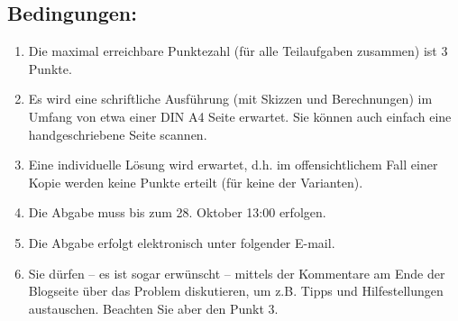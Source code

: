 \subsection{Bedingungen:}
\begin{enumerate}
  \item Die maximal erreichbare Punktezahl (für alle Teilaufgaben zusammen) 
        ist 3 Punkte.
  \item Es wird eine schriftliche Ausführung (mit Skizzen und Berechnungen) im 
        Umfang von etwa einer DIN A4 Seite erwartet. Sie können auch einfach 
        eine handgeschriebene Seite scannen.
  \item Eine individuelle Lösung wird erwartet, d.h. im offensichtlichem Fall 
        einer Kopie werden keine Punkte erteilt (für keine der Varianten).
  \item Die Abgabe muss bis zum 28. Oktober 13:00 erfolgen.
  \item Die Abgabe erfolgt elektronisch unter folgender E-mail.
  \item Sie dürfen – es ist sogar erwünscht – mittels der Kommentare am Ende 
        der Blogseite über das Problem diskutieren, um z.B. Tipps und 
        Hilfestellungen austauschen. Beachten Sie aber den Punkt 3.
\end{enumerate}